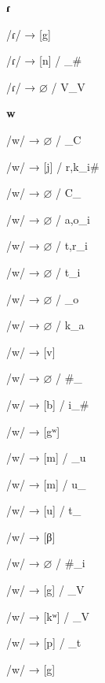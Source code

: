 \begin{center}\textbf{ɾ}\end{center}
\begin{multicols}{4}
\noindent /ɾ/ → [g]

\noindent /ɾ/ → [n] / \_\#

\noindent /ɾ/ → $\varnothing$ / V\_V

\end{multicols}

\begin{center}\textbf{w}\end{center}
\begin{multicols}{4}
\noindent /w/ → $\varnothing$ / \_C

\noindent /w/ → [j] / {r,k}\_i\#

\noindent /w/ → $\varnothing$ / C\_

\noindent /w/ → $\varnothing$ / {a,o}\_i

\noindent /w/ → $\varnothing$ / {t,r}\_i

\noindent /w/ → $\varnothing$ / t\_i

\noindent /w/ → $\varnothing$ / \_o

\noindent /w/ → $\varnothing$ / k\_a

\noindent /w/ → [v]

\noindent /w/ → $\varnothing$ / \#\_

\noindent /w/ → [b] / i\_\#

\noindent /w/ → [gʷ]

\noindent /w/ → [m] / \_u

\noindent /w/ → [m] / u\_

\noindent /w/ → [u] / t\_

\noindent /w/ → [β]

\noindent /w/ → $\varnothing$ / \#\_i

\noindent /w/ → [g] / \_V

\noindent /w/ → [kʷ] / \_V

\noindent /w/ → [p] / \_t

\noindent /w/ → [g]

\end{multicols}

